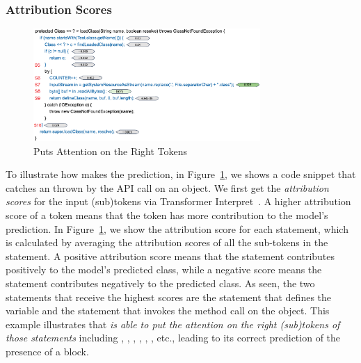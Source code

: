 \subsubsection{Attribution Scores}

\begin{figure}[t]
 	\centering
 	\includegraphics[width=3.4in]{rq1-case-study.png}
        \vspace{-20pt}
 	\caption{{\xblock} Puts Attention on the Right Tokens}
 	\label{fig:rq1-case}	
\end{figure}


To illustrate how {\xblock} makes the prediction, in
Figure~\ref{fig:rq1-case}, we shows a code snippet that catches an
 thrown by the  API call on an
 object.
%
We first get the {\em attribution scores} for the input (sub)tokens
via Transformer Interpret~\cite{transformers-interpret}. A higher
attribution score of a token means that the token has more
contribution to the model's prediction. In Figure~\ref{fig:rq1-case},
we show the attribution score for each statement, which is calculated
by averaging the attribution scores of all the sub-tokens in the
statement.
%
%
A positive attribution score means that the statement contributes
positively to the model's predicted class, while a negative score
means the statement contributes negatively to the predicted class.  As
seen, the two statements that receive the highest scores are the
statement that defines the  variable and the
statement that invokes the  method call on the
 object. This example illustrates that {\em {\tool}
  is able to put the attention on the right (sub)tokens of those
  statements} including , , ,
, , , etc., leading to its
correct prediction of the presence of a  block.

